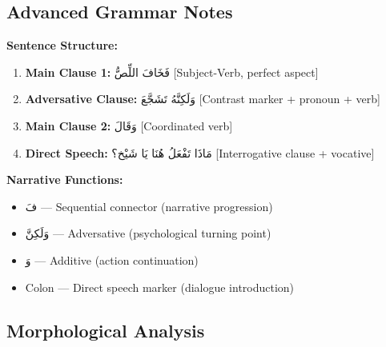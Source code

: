 \documentclass[letterpaper,12pt]{article}
\begin{document}
\subsection{Advanced Grammar Notes}

\begin{tcolorbox}[colback=white,colframe=headercolor,title=\textbf{Syntactic Analysis},breakable]
\textbf{Sentence Structure:}
\begin{enumerate}
\item \textbf{Main Clause 1:} \textarabic{فَخَافَ اللِّصُّ} [Subject-Verb, perfect aspect]
\item \textbf{Adversative Clause:} \textarabic{وَلَكِنَّهُ تَشَجَّعَ} [Contrast marker + pronoun + verb]
\item \textbf{Main Clause 2:} \textarabic{وَقَالَ} [Coordinated verb]
\item \textbf{Direct Speech:} \textarabic{مَاذَا تَفْعَلُ هُنَا يَا شَيْخ؟} [Interrogative clause + vocative]
\end{enumerate}

\textbf{Narrative Functions:}
\begin{itemize}
\item \textarabic{فَ} — Sequential connector (narrative progression)
\item \textarabic{وَلَكِنَّ} — Adversative (psychological turning point)
\item \textarabic{وَ} — Additive (action continuation)
\item Colon — Direct speech marker (dialogue introduction)
\end{itemize}
\end{tcolorbox}

\subsection{Morphological Analysis}
\end{document}
